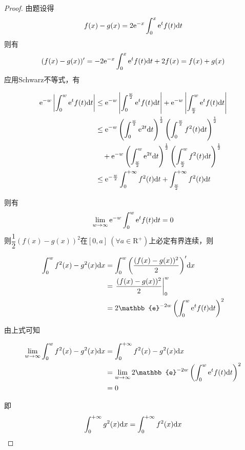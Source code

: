 \begin{proof}

    由题设得
    \[f(x) - g(x) = 2\mathrm{e}^{-x}\int_{0}^{x}{\mathrm{e}^tf(t)}\mathrm{d} t\]
    则有
    \[(f(x) - g(x))' = -2\mathrm{e}^{-x}\int_{0}^{x}{\mathrm{e}^tf(t)}\mathrm{d} t + 2f(x) = f(x) + g(x)\]
    应用\textup{Schwarz}不等式，有

    \begin{align*}
        \mathrm{e}^{-w} \left| \int_{0}^{w}{\mathrm{e}^tf(t)}\mathrm{d} t \right| & \leq \mathrm{e}^{-w} \left| \int_{0}^{\frac{w}{2}}{\mathrm{e}^tf(t)}\mathrm{d} t \right| + \mathrm{e}^{-w} \left| \int_{\frac{w}{2}}^{w}{\mathrm{e}^tf(t)}\mathrm{d} t \right| \\
        & \leq \mathrm{e}^{-w} \left( \int_{0}^{\frac{w}{2}}{\mathrm{e}^{2t}}\mathrm{d} t \right)^{\frac{1}{2}} \left( \int_{0}^{\frac{w}{2}}{f^2(t)}\mathrm{d} t \right)^{\frac{1}{2}} \\
        & \quad + \mathrm{e}^{-w} \left( \int_{\frac{w}{2}}^{w}{\mathrm{e}^{2t}}\mathrm{d} t \right)^{\frac{1}{2}} \left( \int_{\frac{w}{2}}^{w}{f^2(t)}\mathrm{d} t \right)^{\frac{1}{2}} \\
        & \leq \mathrm{e}^{-\frac{w}{2}} \int_{0}^{+\infty}{f^2(t)}\mathrm{d} t + \int_{\frac{w}{2}}^{+\infty}{f^2(t)}\mathrm{d} t
    \end{align*}

    则有
    \[\lim\limits_{w \to \infty}{\mathrm{e}^{-w}\int_{0}^{w}{\mathrm{e}^tf(t)}\mathrm{d} t} = 0\]
    则$\dfrac{1}{2}(f(x) - g(x))^2$在$[0, a]\ (\forall a \in \mathrm{R}^+)$上必定有界连续，则

    \begin{align*}
        \int_{0}^{w}{f^2(x) - g^2(x)}\diff x & = \int_{0}^{w}{\left( \dfrac{(f(x) - g(x))^2}{2} \right)'}\diff x \\
        & = \left. \dfrac{(f(x) - g(x))^2}{2} \right|_{0}^{w} \\ 
        & = 2 \mathbb{e}^{-2w} \left( \int_{0}^{w}{\euler^tf(t)}\diff t \right)^2
    \end{align*}

    由上式可知

    \begin{align*}
        \lim\limits_{w \to \infty}{\int_{0}^{w}{f^2(x) - g^2(x)}\diff x} & = \int_{0}^{+\infty}{f^2(x) - g^2(x)}\diff x \\
        & = \lim\limits_{w \to \infty}{2 \mathbb{e}^{-2w} \left( \int_{0}^{w}{\euler^tf(t)}\diff t \right)^2} \\
        & = 0
    \end{align*}

    即
    \[\int_{0}^{+\infty}{g^2(x)}\mathrm{d} x = \int_{0}^{+\infty}{f^2(x)}\mathrm{d} x\]

\end{proof}

